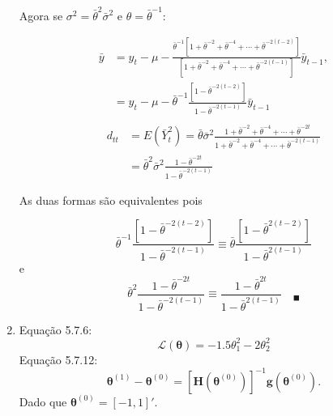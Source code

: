 \begin{enumerate}
	Agora se $\sigma^2=\bar{\theta}^2\bar{\sigma}^2$ e $\theta=\bar{\theta}^{-1}$:
	
		\begin{align*}
	\bar{y}&=y_t-\mu-\frac{\bar{\theta}^{-1}[1+\bar{\theta}^{-2}+\bar{\theta}^{-4}+\cdots+\bar{\theta}^{-2(t-2)}]}{[1+\bar{\theta}^{-2}+\bar{\theta}^{-4}+\cdots+\bar{\theta}^{-2(t-1)}]}\bar{y}_{t-1},\\
	&=y_t-\mu-\bar{\theta}^{-1}\frac{[1-\bar{\theta}^{-2(t-2)}]}{1-\bar{\theta}^{-2(t-1)}}\bar{y}_{t-1}\\
	\end{align*}
	\begin{align*}
	d_{tt}&=E(\bar{Y}_t^2)=\bar{\theta}\bar{\sigma}^2\frac{1+\bar{\theta}^{-2}+\bar{\theta}^{-4}+\cdots+\bar{\theta}^{-2t}}{1+\bar{\theta}^{-2}+\bar{\theta}^{-4}+\cdots+\bar{\theta}^{-2(t-1)}}\\
	&=\bar{\theta}^2\bar{\sigma}^2\frac{1-\bar{\theta}^{-2t}}{1-\bar{\theta}^{-2(t-1)}}
	\end{align*}
	
	As duas formas são equivalentes pois
	
	$$\bar{\theta}^{-1}\frac{[1-\bar{\theta}^{-2(t-2)}]}{1-\bar{\theta}^{-2(t-1)}}\equiv \bar{\theta}\frac{[1-\bar{\theta}^{2(t-2)}]}{1-\bar{\theta}^{2(t-1)}}$$
	e
	$$\bar{\theta}^2\frac{1-\bar{\theta}^{-2t}}{1-\bar{\theta}^{-2(t-1)}}\equiv \frac{1-\bar{\theta}^{2t}}{1-\bar{\theta}^{2(t-1)}}\quad_\blacksquare$$
	
	
	\item[\fbox{5.2}]
	
	
		Equação 5.7.6: $$\mathscr{L}(\boldsymbol{\theta}) = -1.5\theta_1^2-2\theta_2^2$$
		Equação 5.7.12: $$\boldsymbol{\theta}^{(1)}-\boldsymbol{\theta}^{(0)}=[\mathbf{H}(\boldsymbol{\theta}^{(0)})]^{-1}\mathbf{g}(\boldsymbol{\theta}^{(0)}).$$
		Dado que $\boldsymbol{\theta}^{(0)}=[-1,1]'$.
		

\end{enumerate}

